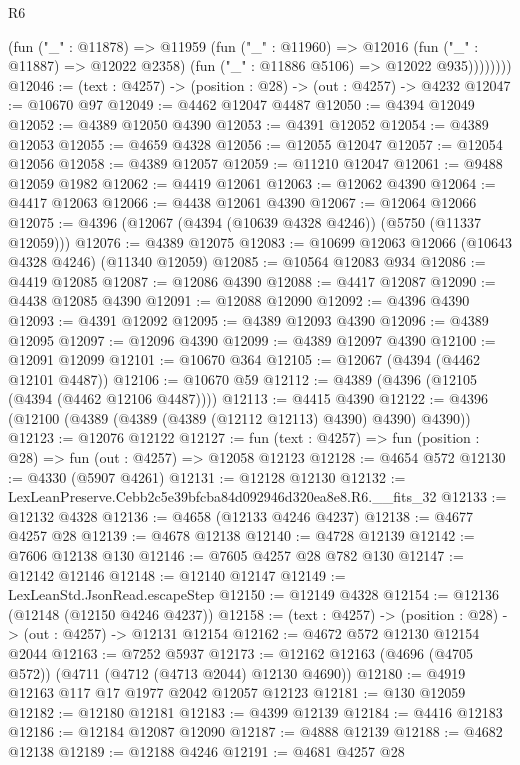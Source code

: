 \begin{lexlean}{R6}
\begin{coremodule}
              (fun ("_" : @11878) =>
              @11959
                (fun ("_" : @11960) =>
                @12016
                  (fun ("_" : @11887) => @12022 @2358)
                  (fun ("_" : @11886 @5106) => @12022 @935))))))))
@12046 := (text : @4257) -> (position : @28) -> (out : @4257) -> @4232
@12047 := @10670 @97
@12049 := @4462 @12047 @4487
@12050 := @4394 @12049
@12052 := @4389 @12050 @4390
@12053 := @4391 @12052
@12054 := @4389 @12053
@12055 := @4659 @4328
@12056 := @12055 @12047
@12057 := @12054 @12056
@12058 := @4389 @12057
@12059 := @11210 @12047
@12061 := @9488 @12059 @1982
@12062 := @4419 @12061
@12063 := @12062 @4390
@12064 := @4417 @12063
@12066 := @4438 @12061 @4390
@12067 := @12064 @12066
@12075 := @4396 (@12067 (@4394 (@10639 @4328 @4246)) (@5750 (@11337 @12059)))
@12076 := @4389 @12075
@12083 := @10699 @12063 @12066 (@10643 @4328 @4246) (@11340 @12059)
@12085 := @10564 @12083 @934
@12086 := @4419 @12085
@12087 := @12086 @4390
@12088 := @4417 @12087
@12090 := @4438 @12085 @4390
@12091 := @12088 @12090
@12092 := @4396 @4390
@12093 := @4391 @12092
@12095 := @4389 @12093 @4390
@12096 := @4389 @12095
@12097 := @12096 @4390
@12099 := @4389 @12097 @4390
@12100 := @12091 @12099
@12101 := @10670 @364
@12105 := @12067 (@4394 (@4462 @12101 @4487))
@12106 := @10670 @59
@12112 := @4389 (@4396 (@12105 (@4394 (@4462 @12106 @4487))))
@12113 := @4415 @4390
@12122 := @4396 (@12100 (@4389 (@4389 (@4389 (@12112 @12113) @4390) @4390) @4390))
@12123 := @12076 @12122
@12127 := fun (text : @4257) => fun (position : @28) => fun (out : @4257) => @12058 @12123
@12128 := @4654 @572
@12130 := @4330 (@5907 @4261)
@12131 := @12128 @12130
@12132 := LexLeanPreserve.Cebb2c5e39bfcba84d092946d320ea8e8.R6.__fits_32
@12133 := @12132 @4328
@12136 := @4658 (@12133 @4246 @4237)
@12138 := @4677 @4257 @28
@12139 := @4678 @12138
@12140 := @4728 @12139
@12142 := @7606 @12138 @130
@12146 := @7605 @4257 @28 @782 @130
@12147 := @12142 @12146
@12148 := @12140 @12147
@12149 := LexLeanStd.JsonRead.escapeStep
@12150 := @12149 @4328
@12154 := @12136 (@12148 (@12150 @4246 @4237))
@12158 := (text : @4257) -> (position : @28) -> (out : @4257) -> @12131 @12154
@12162 := @4672 @572 @12130 @12154 @2044
@12163 := @7252 @5937
@12173 := @12162 @12163 (@4696 (@4705 @572)) (@4711 (@4712 (@4713 @2044) @12130 @4690))
@12180 := @4919 @12163 @117 @17 @1977 @2042 @12057 @12123
@12181 := @130 @12059
@12182 := @12180 @12181
@12183 := @4399 @12139
@12184 := @4416 @12183
@12186 := @12184 @12087 @12090
@12187 := @4888 @12139
@12188 := @4682 @12138
@12189 := @12188 @4246
@12191 := @4681 @4257 @28

\end{coremodule}
\end{lexlean}
